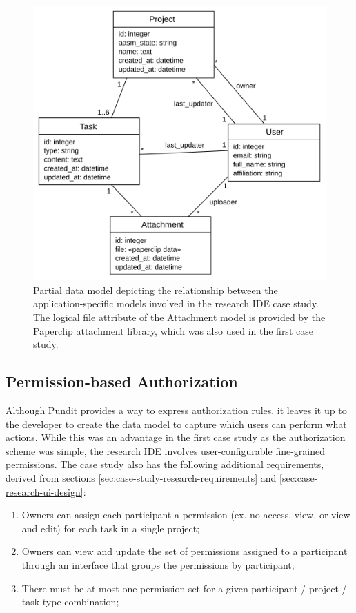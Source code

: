 \documentclass[document.tex]{subfiles}
\begin{document}
\begin{figure}[!ht]
\centering \includegraphics[width=5.0in]{./img/case-study-research-railgun/data-model}
\caption{Partial data model depicting the relationship between the application-specific models involved in the research IDE case study. The logical file attribute of the Attachment model is provided by the Paperclip attachment library, which was also used in the first case study.}
\label{fig:case-research-data-model}
\end{figure}


\FloatBarrier

\subsection {Permission-based Authorization}
\label{sec:case-research-permission-based-auth}

Although Pundit provides a way to express authorization rules, it leaves it up to the developer to create the data model to capture which users can perform what actions. While this was an advantage in the first case study as the authorization scheme was simple, the research IDE involves user-configurable fine-grained permissions. The case study also has the following additional requirements, derived from sections \ref{sec:case-study-research-requirements} and \ref{sec:case-research-ui-design}:
\begin{enumerate}
\item Owners can assign each participant a permission (ex. no access, view, or view and edit) for each task in a single project;
\item Owners can view and update the set of permissions assigned to a participant through an interface that groups the permissions by participant;
\item There must be at most one permission set for a given participant / project / task type combination;
\end{enumerate}
\end{document}

